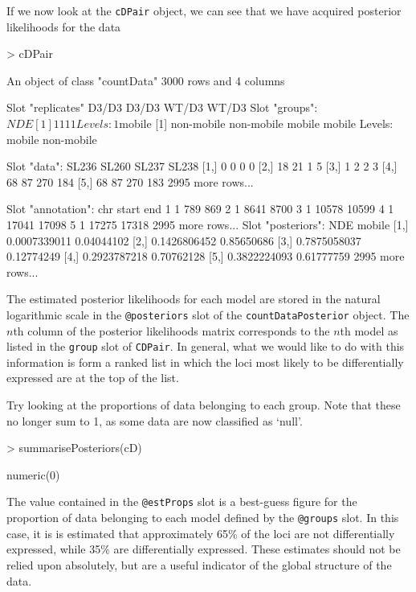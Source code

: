 \documentclass[a4paper]{article}
\begin{document}
If we now look at the \verb'cDPair' object, we can see that we have acquired posterior likelihoods for the data
\begin{Schunk}
\begin{Sinput}
> cDPair
\end{Sinput}
\begin{Soutput}
An object of class "countData"
3000 rows and 4 columns

Slot "replicates"
D3/D3 D3/D3 WT/D3 WT/D3
Slot "groups":
$NDE
[1] 1 1 1 1
Levels: 1

$mobile
[1] non-mobile non-mobile mobile     mobile    
Levels: mobile non-mobile


Slot "data":
     SL236 SL260 SL237 SL238
[1,]     0     0     0     0
[2,]    18    21     1     5
[3,]     1     2     2     3
[4,]    68    87   270   184
[5,]    68    87   270   183
2995 more rows...

Slot "annotation":
  chr start   end
1   1   789   869
2   1  8641  8700
3   1 10578 10599
4   1 17041 17098
5   1 17275 17318
2995 more rows...
Slot "posteriors":
              NDE     mobile
[1,] 0.0007339011 0.04044102
[2,] 0.1426806452 0.85650686
[3,] 0.7875058037 0.12774249
[4,] 0.2923787218 0.70762128
[5,] 0.3822224093 0.61777759
2995 more rows...
\end{Soutput}
\end{Schunk}
The estimated posterior likelihoods for each model are stored in the natural logarithmic scale in the \verb'@posteriors' slot of the \verb'countDataPosterior' object. The $n$th column of the posterior likelihoods matrix corresponds to the $n$th model as listed in the \verb'group' slot of \verb'CDPair'. In general, what we would like to do with this information is form a ranked list in which the loci most likely to be differentially expressed are at the top of the list.

Try looking at the proportions of data belonging to each group. Note that these no longer sum to 1, as some data are now classified as `null'.
\begin{Schunk}
\begin{Sinput}
> summarisePosteriors(cD)
\end{Sinput}
\begin{Soutput}
numeric(0)
\end{Soutput}
\end{Schunk}

The value contained in the \verb'@estProps' slot is a best-guess figure for the proportion of data belonging to each model defined by the \verb'@groups' slot. In this case, it is is estimated that approximately 65\% of the loci are not differentially expressed, while 35\% are differentially expressed. These estimates should not be relied upon absolutely, but are a useful indicator of the global structure of the data.
\end{document}
